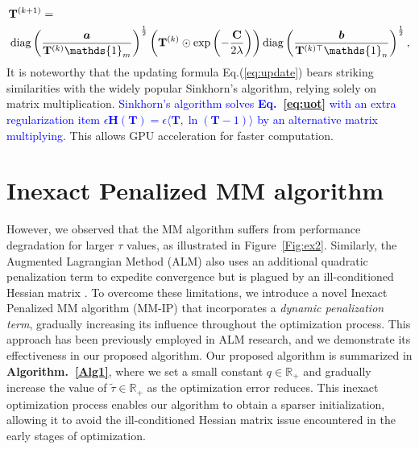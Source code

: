 \documentclass[a4paper,twocolumn]{article}
\newcommand{\R}{\mathbb{R}}
\newcommand{\one}{\mathds{1}}
\newcommand{\mat}[1]{\mathbf{#1}}
\renewcommand{\vec}[1]{\bm{#1}}
\newcommand{\changeSX}[1]{\textcolor{blue}{#1}}
\begin{document}
\begin{align}
\label{eq:update}
&\mat{T}^{(k+1)}=\notag\\
&\operatorname{diag}\left(\frac{\vec a}{\mat{T}^{(k)} \one_m}\right)^{\frac{1}{2}}\left(\mat{T}^{(k)} \odot \exp \left(-\frac{\mat C}{2 \lambda}\right)\right)
\operatorname{diag}\left(\frac{\vec{b}}{\mat{T}^{(k) \top} \one_n}\right)^{\frac{1}{2}},\notag\\
\end{align}
It is noteworthy that the updating formula Eq.(\ref{eq:update}) bears striking similarities with the widely popular Sinkhorn's algorithm, relying solely on matrix multiplication. \changeSX{Sinkhorn's algorithm solves {\bf Eq.~\ref{eq:uot}} with an extra regularization item $\epsilon \mat H(\mat T) = \epsilon \langle \mat T,\ln(\mat T - 1)\rangle$ by an alternative matrix multiplying.} This allows GPU acceleration for faster computation.

\section{Inexact Penalized MM algorithm}
However, we observed that the MM algorithm suffers from performance degradation for larger $\tau$ values, as illustrated in Figure~\ref{Fig:ex2}. Similarly, the Augmented Lagrangian Method (ALM) also uses an additional quadratic penalization term to expedite convergence but is plagued by an ill-conditioned Hessian matrix \cite{doi:10.1137/1.9781611973365}.
To overcome these limitations, we introduce a novel Inexact Penalized MM algorithm (MM-IP) that incorporates a {\it dynamic penalization term}, gradually increasing its influence throughout the optimization process. This approach has been previously employed in ALM research, and we demonstrate its effectiveness in our proposed algorithm. Our proposed algorithm is summarized in {\bf Algorithm.~\ref{Alg1}}, where we set a small constant $q \in \R_+ $ and gradually increase the value of $\tilde{\tau}\in \R_+$ as the optimization error reduces. This inexact optimization process enables our algorithm to obtain a sparser initialization, allowing it to avoid the ill-conditioned Hessian matrix issue encountered in the early stages of optimization.
\end{document}
